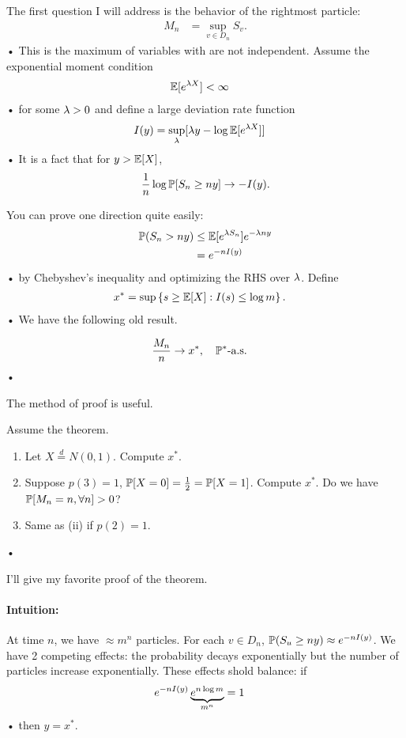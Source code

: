 The first question I will address is the behavior of the rightmost particle:
\begin{align*}
M_n &=\sup_{v\in D_n} S_v.
\end{align*}•
This is the maximum of variables with are not independent. %
Assume the exponential moment condition
\begin{align*}
\mathbb{E}[e^{\lambda X}] &<\infty
\end{align*}•
for some $\lambda>0$ and define a large deviation rate function
\begin{align*}
I(y) &= \sup_\lambda [\lambda y - \log \mathbb{E}[e^{\lambda X}]]
\end{align*}•
It is a fact that for $y>\mathbb{E}[X]$, 
$$\frac{1}{n} \log \mathbb{P}[S_n\ge ny]\to -I(y).$$

You can prove one direction quite easily:
\begin{align*}
\mathbb{P}(S_n>ny) &\le \mathbb{E}[e^{\lambda S_n}]e^{-\lambda ny}\\
&= e^{-n I(y)}
\end{align*}•
by Chebyshev's inequality and optimizing the RHS over $\lambda$. %
Define
\begin{align*}
x^* &= \sup \left\{{s\ge \mathbb{E}[X]}:{I(s)\le \log m}\right\}.
\end{align*}•
We have the following old result.
\begin{thm}
\begin{align*}
\frac{M_n}{n} &\to x^*,\quad \mathbb{P}^*\text{-a.s.}
\end{align*}•
\end{thm}
The method of proof is useful.
\begin{exr}
Assume the theorem.
\begin{enumerate}
\item
Let $X\stackrel d=N(0,1)$. Compute $x^*$.
\item 
Suppose $p(3)=1$, $\mathbb{P}[X=0]=\frac{1}{2} = \mathbb{P}[X=1]$. Compute $x^*$. Do we have $\mathbb{P}[M_n=n,\forall n]>0$?
\item
Same as (ii) if $p(2)=1$.
\end{enumerate}•
\end{exr}
I'll give my favorite proof of the theorem.

\paragraph{Intuition:} At time $n$, we have $\approx m^n$ particles. For each $v\in D_n$, $\mathbb{P}(S_u\ge ny) \approx e^{-n I(y)}$. We have 2 competing effects: the probability decays exponentially but the number of particles increase exponentially. These effects shold balance: if
\begin{align*}
e^{-n I(y)} \underbrace{e^{n\log m}}_{m^n} &=1
\end{align*}•
then $y=x^*$.

